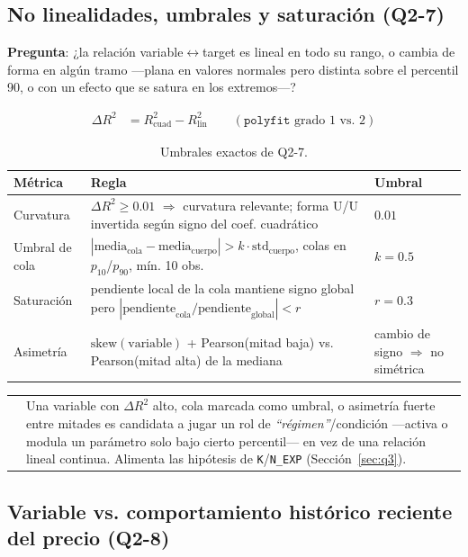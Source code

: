 \documentclass[11pt,a4paper]{article}
\makeatletter
\newcommand{\code}[1]{\texttt{\small #1}}
\newenvironment{clave}{%
  \par\medskip\noindent
  \begin{tabular}{@{}p{0.4em}@{\hspace{8pt}}p{\dimexpr\linewidth-2em\relax}@{}}
  \textcolor{cmorado}{\rule{3pt}{1.1em}} &
}{\end{tabular}\par\medskip}
\newcommand{\dq}[1]{\emph{``#1''}}
\makeatother
\begin{document}
\subsection{No linealidades, umbrales y saturación (Q2-7)}

\textbf{Pregunta}: ¿la relación variable$\leftrightarrow$target es lineal en todo su rango, o cambia de
forma en algún tramo —plana en valores normales pero distinta sobre el percentil 90, o con
un efecto que se satura en los extremos—?

\begin{align}
\Delta R^2 &= R^2_{\mathrm{cuad}} - R^2_{\mathrm{lin}}
  \qquad (\texttt{polyfit} \text{ grado 1 vs. 2})
\end{align}

\begin{table}[h]
\centering
\small
\begin{tabularx}{\linewidth}{@{}l X l@{}}
\toprule
\textbf{Métrica} & \textbf{Regla} & \textbf{Umbral} \\
\midrule
Curvatura & \(\Delta R^2 \geq 0.01\) \(\Rightarrow\) curvatura relevante; forma U/U
  invertida según signo del coef. cuadrático & \(0.01\) \\
Umbral de cola & \(|\text{media}_{\text{cola}} - \text{media}_{\text{cuerpo}}| > k \cdot
  \text{std}_{\text{cuerpo}}\), colas en \(p_{10}\)/\(p_{90}\), mín. 10 obs. & \(k=0.5\) \\
Saturación & pendiente local de la cola mantiene signo global pero
  \(|\text{pendiente}_{\text{cola}}/\text{pendiente}_{\text{global}}| < r\) & \(r=0.3\) \\
Asimetría & \(\mathrm{skew}(\text{variable})\) + Pearson(mitad baja) vs.
  Pearson(mitad alta) de la mediana & cambio de signo \(\Rightarrow\) no simétrica \\
\bottomrule
\end{tabularx}
\caption{Umbrales exactos de Q2-7.}
\end{table}

\begin{clave}
Una variable con \(\Delta R^2\) alto, cola marcada como umbral, o asimetría fuerte entre
mitades es candidata a jugar un rol de \dq{régimen}/condición —activa o modula un
parámetro solo bajo cierto percentil— en vez de una relación lineal continua. Alimenta las
hipótesis de \code{K}/\code{N\_EXP} (Sección~\ref{sec:q3}).
\end{clave}

\subsection{Variable vs. comportamiento histórico reciente del precio (Q2-8)}
\end{document}
